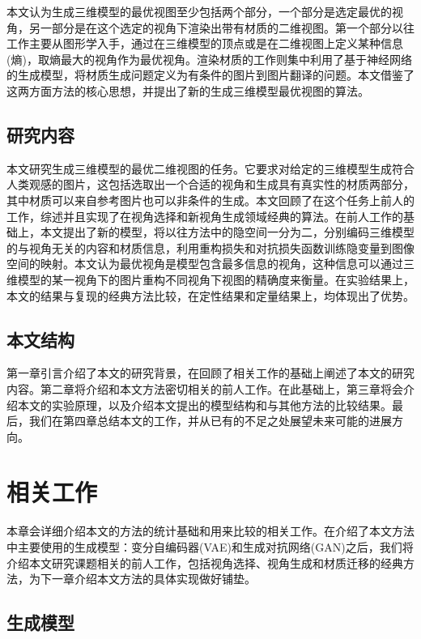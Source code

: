 \documentclass[UTF8,openany,AutoFakeBold,AutoFakeSlant,cs4size]{ctexbook}
\begin{document}
本文认为生成三维模型的最优视图至少包括两个部分，一个部分是选定最优的视角，另一部分是在这个选定的视角下渲染出带有材质的二维视图。第一个部分以往工作主要从图形学入手，通过在三维模型的顶点或是在二维视图上定义某种信息(熵)，取熵最大的视角作为最优视角。渲染材质的工作则集中利用了基于神经网络的生成模型，将材质生成问题定义为有条件的图片到图片翻译的问题。本文借鉴了这两方面方法的核心思想，并提出了新的生成三维模型最优视图的算法。

\section{研究内容}

本文研究生成三维模型的最优二维视图的任务。它要求对给定的三维模型生成符合人类观感的图片，这包括选取出一个合适的视角和生成具有真实性的材质两部分，其中材质可以来自参考图片也可以非条件的生成。本文回顾了在这个任务上前人的工作，综述并且实现了在视角选择和新视角生成领域经典的算法。在前人工作的基础上，本文提出了新的模型，将以往方法中的隐空间一分为二，分别编码三维模型的与视角无关的内容和材质信息，利用重构损失和对抗损失函数训练隐变量到图像空间的映射。本文认为最优视角是模型包含最多信息的视角，这种信息可以通过三维模型的某一视角下的图片重构不同视角下视图的精确度来衡量。在实验结果上，本文的结果与复现的经典方法比较，在定性结果和定量结果上，均体现出了优势。

\section{本文结构}

第一章引言介绍了本文的研究背景，在回顾了相关工作的基础上阐述了本文的研究内容。第二章将介绍和本文方法密切相关的前人工作。在此基础上，第三章将会介绍本文的实验原理，以及介绍本文提出的模型结构和与其他方法的比较结果。最后，我们在第四章总结本文的工作，并从已有的不足之处展望未来可能的进展方向。



\clearpage

\chapter{相关工作}

本章会详细介绍本文的方法的统计基础和用来比较的相关工作。在介绍了本文方法中主要使用的生成模型：变分自编码器(VAE)\cite{kingma2014autoencoding}和生成对抗网络(GAN)\cite{NIPS2014_5423}之后，我们将介绍本文研究课题相关的前人工作，包括视角选择、视角生成和材质迁移的经典方法，为下一章介绍本文方法的具体实现做好铺垫。


\section{生成模型}
\end{document}
